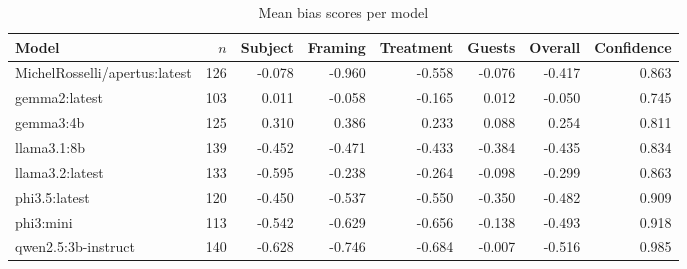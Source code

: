 \begin{table}[ht]
\centering
\caption{Mean bias scores per model}
\label{tab:bias_scores}
\begin{tabular}{l r r r r r r r}
\hline
Model & $n$ & Subject & Framing & Treatment & Guests & Overall & Confidence \\
\hline
MichelRosselli/apertus:latest & 126 & -0.078 & -0.960 & -0.558 & -0.076 & -0.417 & 0.863 \\
gemma2:latest & 103 & 0.011 & -0.058 & -0.165 & 0.012 & -0.050 & 0.745 \\
gemma3:4b & 125 & 0.310 & 0.386 & 0.233 & 0.088 & 0.254 & 0.811 \\
llama3.1:8b & 139 & -0.452 & -0.471 & -0.433 & -0.384 & -0.435 & 0.834 \\
llama3.2:latest & 133 & -0.595 & -0.238 & -0.264 & -0.098 & -0.299 & 0.863 \\
phi3.5:latest & 120 & -0.450 & -0.537 & -0.550 & -0.350 & -0.482 & 0.909 \\
phi3:mini & 113 & -0.542 & -0.629 & -0.656 & -0.138 & -0.493 & 0.918 \\
qwen2.5:3b-instruct & 140 & -0.628 & -0.746 & -0.684 & -0.007 & -0.516 & 0.985 \\
\hline
\end{tabular}
\end{table}